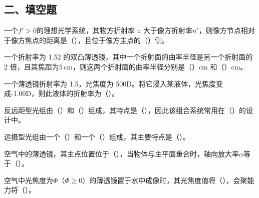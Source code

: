 \documentclass[standard, analysis, notocnum]{ExBook}
\newcommand{\answerarea}[1][8cm]{%
  \par\vspace{2mm}%
  \noindent{\color{themeColor!35}\rule{\linewidth}{0.4pt}}\par
  \noindent\begin{minipage}[t][#1][t]{\linewidth}\vspace{0pt}\end{minipage}\par
  \noindent{\color{themeColor!35}\rule{\linewidth}{0.4pt}}\par
}
\begin{document}
\subsection{二、填空题}
\begin{qitems}
\begin{bbox}
\qitem 一个$f'>0$的理想光学系统，其物方折射率 n 大于像方折射率$n'$，则像方节点相对于像方焦点的距离是（\hspace{1.6em}），且位于像方主点的（\hspace{1.6em}）侧。
\answerarea[3.5cm]
\end{bbox}
\begin{bbox}
\qitem 一个折射率为 1.52 的双凸薄透镜，其中一个折射面的曲率半径是另一个折射面的 2 倍，且其焦距为$5\,\mathrm{cm}$，则这两个折射面的曲率半径分别是（\hspace{1.6em}）cm 和（\hspace{1.6em}）cm。
\answerarea[3.5cm]
\end{bbox}
\begin{bbox}
\qitem 一个薄透镜折射率为 1.5，光焦度为 500D。将它浸入某液体，光焦度变成-1.00D，则此液体的折射率为（\hspace{1.6em}）。
\answerarea[3.5cm]
\end{bbox}
\begin{bbox}
\qitem 反远距型光组由（\hspace{1.6em}）和（\hspace{1.6em}）组成，其特点是（\hspace{1.6em}），因此该组合系统常用在（\hspace{1.6em}）的设计中。
\answerarea[3.5cm]
\end{bbox}
\begin{bbox}
\qitem 远摄型光组由一个（\hspace{1.6em}）和一个（\hspace{1.6em}）组成，其主要特点是（\hspace{1.6em}）。
\answerarea[3.5cm]
\end{bbox}
\begin{bbox}
\qitem 空气中的薄透镜，其主点位置位于（\hspace{1.6em}），当物体与主平面重合时，轴向放大率$\alpha$等于（\hspace{1.6em}）。
\answerarea[3.5cm]
\end{bbox}
\begin{bbox}
\qitem 空气中光焦度为$\Phi$（$\Phi \geq 0$）的薄透镜置于水中成像时，其光焦度值将（\hspace{1.6em}），会聚能力将（\hspace{1.6em}）。
\answerarea[3.5cm]
\end{bbox}
\end{qitems}
\end{document}
